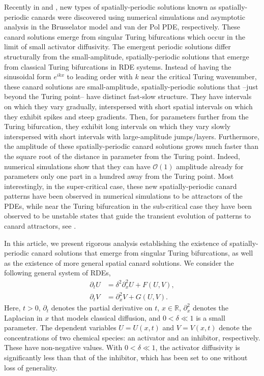 \documentclass[11pt]{article}
\numberwithin{equation}{section}
\begin{document}
Recently in \cite{JDKV2026} and \cite{VDK2025}, new types of spatially-periodic solutions known as spatially-periodic canards were discovered using numerical simulations and asymptotic analysis in the Brusselator model and van der Pol PDE, respectively.
These canard solutions emerge from singular Turing bifurcations
which occur in the limit of small activator diffusivity.
The emergent periodic solutions differ structurally from the small-amplitude, spatially-periodic solutions that emerge from classical Turing bifurcations in RDE systems.
Instead of having the sinusoidal form $e^{ik x}$ to leading order with $k$ near the critical Turing wavenumber, these canard solutions are small-amplitude, spatially-periodic solutions that --just beyond the Turing point-- have distinct fast-slow structure.
They have intervals on which they vary gradually, interspersed with short spatial intervals on which they exhibit spikes and steep gradients.
Then, for parameters further from the Turing bifurcation, they exhibit long intervals on which they vary slowly interspersed with short intervals with large-amplitude jumps/layers.
Furthermore, the amplitude of these spatially-periodic canard solutions grows much faster than the square root of the distance in parameter from the Turing point.
Indeed, numerical simulations show that they can have $\mathcal{O}(1)$ amplitude already for parameters only one part in a hundred away from the Turing point. 
Most interestingly, in the super-critical case, these new spatially-periodic canard patterns have been observed in numerical simulations to be attractors of the PDEs, while near the Turing bifurcation in the sub-critical case they have been observed to be unstable states that guide the transient evolution of patterns to canard attractors, see \cite{JDKV2026,VDK2025}.

In this article, we present rigorous analysis establishing the existence of spatially-periodic canard solutions that emerge from singular Turing bifurcations, as well as the existence of more general spatial canard solutions.
We consider the following general system of RDEs,
\begin{equation}  \label{eq:genAI-UV}
\begin{split}
    \partial_{t}U &= \delta^2 \partial^2_x U + F(U,V), \\
    \partial_{t}V &= \partial^2_x V + G(U,V).
\end{split}
\end{equation} 
%
Here, $t>0$, $\partial_t$ denotes the partial derivative on $t$, $x \in \mathbb{R}$, $\partial^2_x$ denotes the Laplacian in $x$ that models classical diffusion, and $0<\delta \ll 1$ is a small parameter.
The dependent variables $U=U(x,t)$ and $V=V(x,t)$ denote the concentrations of two chemical species: an activator and an inhibitor, respectively.
These have non-negative values.
With $0<\delta \ll 1$, the activator diffusivity is significantly less than that of the inhibitor, which has been set to one without loss of generality.
\end{document}
